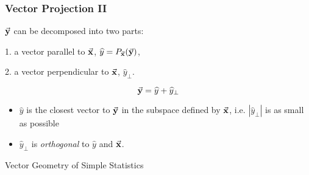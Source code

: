 \documentclass{beamer}
\begin{document}
\begin{frame}
  \frametitle{Vector Projection II}

$\vec{\mathbf{y}}$ can be decomposed into two parts:

1. a vector parallel to $\vec{\mathbf{x}}$, $\widehat{y} = P_{\vec{\mathbf{x}}}(\vec{\mathbf{y}})$, 

\smallskip

2. a vector perpendicular to $\vec{\mathbf{x}}$, $\widehat{y}_{\bot}$.

\[
\vec{\mathbf{y}} = \widehat{y} + \widehat{y}_{\bot}
\]

\begin{center}

\end{center}

\begin{itemize}
 \item $\widehat{y}$  is the closest vector to $\vec{\mathbf{y}}$ in the subspace defined by $\vec{\mathbf{x}}$, i.e. $|\widehat{y}_{\bot}|$ is as small as possible
 \item $\widehat{y}_{\bot}$ is \emph{orthogonal} to $\widehat{y}$ and $\vec{\mathbf{x}}$.
\end{itemize}

\end{frame}

\begin{frame}

\begin{center}
\LARGE{Vector Geometry of Simple Statistics}
\end{center}


\end{frame}
\end{document}
